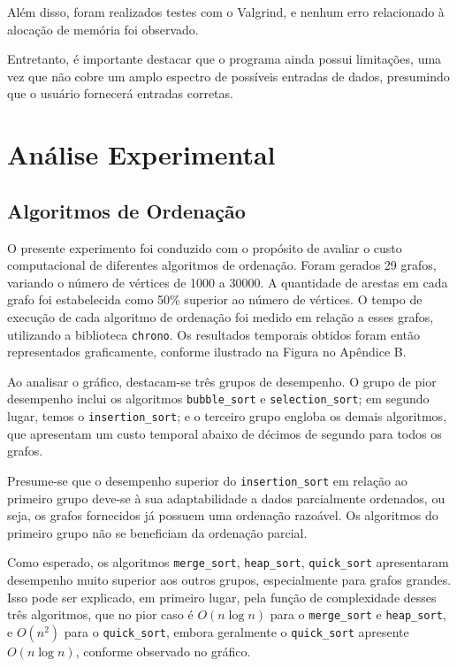 \documentclass{article}
\begin{document}
Além disso, foram realizados testes com o Valgrind, e nenhum erro relacionado à alocação de memória foi observado.

Entretanto, é importante destacar que o programa ainda possui limitações, uma vez que não cobre um amplo espectro de possíveis entradas de dados, presumindo que o usuário fornecerá entradas corretas. 


\section{Análise Experimental}

\subsection{Algoritmos de Ordenação}
O presente experimento foi conduzido com o propósito de avaliar o custo computacional de diferentes algoritmos de ordenação. Foram gerados 29 grafos, variando o número de vértices de 1000 a 30000. A quantidade de arestas em cada grafo foi estabelecida como 50\% superior ao número de vértices. O tempo de execução de cada algoritmo de ordenação foi medido em relação a esses grafos, utilizando a biblioteca \texttt{chrono}. Os resultados temporais obtidos foram então representados graficamente, conforme ilustrado na Figura no Apêndice B.



Ao analisar o gráfico, destacam-se três grupos de desempenho. O grupo de pior desempenho inclui os algoritmos \texttt{bubble\_sort} e \texttt{selection\_sort}; em segundo lugar, temos o \texttt{insertion\_sort}; e o terceiro grupo engloba os demais algoritmos, que apresentam um custo temporal abaixo de décimos de segundo para todos os grafos.

Presume-se que o desempenho superior do \texttt{insertion\_sort} em relação ao primeiro grupo deve-se à sua adaptabilidade a dados parcialmente ordenados, ou seja, os grafos fornecidos já possuem uma ordenação razoável. Os algoritmos do primeiro grupo não se beneficiam da ordenação parcial.

Como esperado, os algoritmos \texttt{merge\_sort}, \texttt{heap\_sort}, \texttt{quick\_sort} apresentaram desempenho muito superior aos outros grupos, especialmente para grafos grandes. Isso pode ser explicado, em primeiro lugar, pela função de complexidade desses três algoritmos, que no pior caso é \(O(n \log n)\) para o \texttt{merge\_sort} e \texttt{heap\_sort}, e \(O(n^2)\) para o \texttt{quick\_sort}, embora geralmente o \texttt{quick\_sort} apresente \(O(n \log n)\), conforme observado no gráfico.
\end{document}
